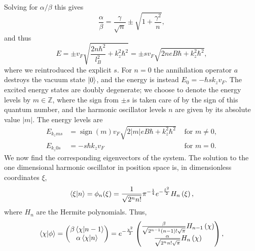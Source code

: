 Solving for $\alpha /\beta $ this gives
\begin{equation}
  \frac{\alpha}{\beta } = \frac{\gamma}{\sqrt{n}} \pm \sqrt{1 + \frac{\gamma^2}{n}},
\end{equation}
and thus
\begin{equation}
  E = \pm v_F \sqrt{
    \frac{2n \hbar ^2}{l_B^2} + k_z^2\hbar ^2
  }
  = \pm s v_F \sqrt{
    2n e B \hbar + k_z^2\hbar ^2
  },
\end{equation}
where we reintroduced the explicit $s$.
For $n = 0$ the annihilation operator $a$ destroys the vacuum state $\ket{0}$, and the energy is instead $E_0 = -\hbar s k_z v_F$.
The excited energy states are doubly degenerate;
we choose to denote the energy levels by $m \in \mathbb{Z}$, where the sign from $\pm s$ is taken care of by the sign of this quantum number, and the harmonic oscillator levels $n$ are given by its absolute value $|m|$.
The energy levels are
\begin{subequations}
  \label{eq:26}
  \begin{align}
    \label{eq:27}
    E_{k_z m s} &= \operatorname{sign}(m) v_F \sqrt{2 |m| e B \hbar  + k_z^2 \hbar ^2} & \text{ for } m \neq 0,\\
    \label{eq:28}
    E_{k_z 0 s} &= -s \hbar k_z v_F & \text{ for } m = 0.
  \end{align}
\end{subequations}
We now find the corresponding eigenvectors of the system.
The solution to the one dimensional harmonic oscillator in position space is, in dimensionless coordinates $\xi$,~\cite[Eq.~18.39.5]{NIST:DLMF}
\begin{equation}
  \braket{\xi | n} = \phi _n (\xi)
  = \frac{1}{\sqrt{2^nn!}} \pi^{-\frac{1}{4}}
  e^{- \frac{\xi^2}{2}} H_n \left( \xi \right),
\end{equation}
where $H_n$ are the Hermite polynomials.
Thus,
\begin{equation}
  \braket{\chi | \phi } =
  \begin{pmatrix}
    \beta \braket{\chi | n-1}\\
    \alpha \braket{\chi | n}
  \end{pmatrix}
  =
  e^{- \frac{\chi^2}{2}}
  \begin{pmatrix}
    \frac{\beta }{\sqrt{2^{n-1}(n-1)!\sqrt{\pi }}} H_{n-1} \left( \chi \right)\\
    \frac{\alpha }{\sqrt{2^{n}n!\sqrt{\pi }}} H_n \left(\chi \right)\\
  \end{pmatrix},
\end{equation}
